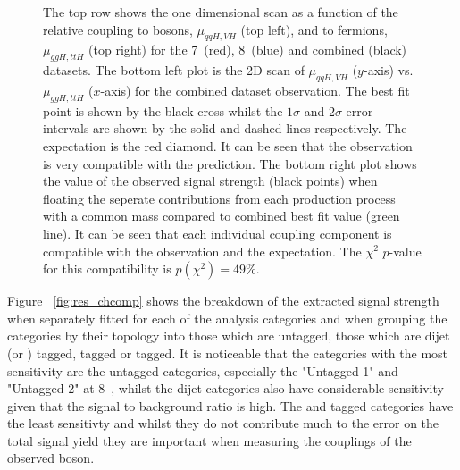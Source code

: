 \begin{figure}
  \caption[Observed best fit values and \NLL scans of the observed bosons couplings to fermions and bosons respectively]{The top row shows the one dimensional \NLL scan as a function of the \SM relative coupling to bosons, $\mu_{qqH,VH}$ (top left), and to fermions, $\mu_{ggH,ttH}$ (top right) for the 7~\TeV (red), 8~\TeV (blue) and combined (black) datasets. The bottom left plot is the 2D \NLL scan of $\mu_{qqH,VH}$ ($y$-axis) vs.~$\mu_{ggH,ttH}$ ($x$-axis) for the combined dataset observation. The best fit point is shown by the black cross whilst the $1\sigma$ and $2\sigma$ error intervals are shown by the solid and dashed lines respectively. The \SM expectation is the red diamond. It can be seen that the observation is very compatible with the \SM prediction. The bottom right plot shows the value of the observed signal strength (black points) when floating the seperate contributions from each production process with a common mass compared to combined best fit value (green line). It can be seen that each individual coupling component is compatible with the observation and the \SM expectation. The $\chi^{2}$ $p$-value for this compatibility is $p(\chi^{2})=49\%$.}
  \label{fig:res_rvrf}
\end{figure}

Figure ~\ref{fig:res_chcomp} shows the breakdown of the extracted signal strength when separately fitted for each of the analysis categories and when grouping the categories by their topology into those which are untagged, those which are dijet (or \VBF) tagged, \VH tagged or \ttH tagged. It is noticeable that the categories with the most sensitivity are the untagged categories, especially the "Untagged 1" and "Untagged 2" at 8~\TeV, whilst the dijet categories also have considerable sensitivity given that the signal to background ratio is high. The \VH and \ttH tagged categories have the least sensitivty and whilst they do not contribute much to the error on the total signal yield they are important when measuring the couplings of the observed boson.

